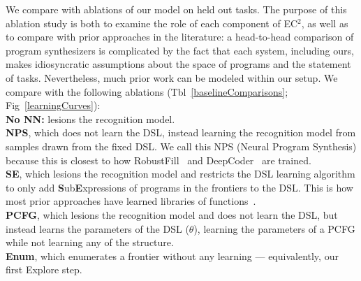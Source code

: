 \documentclass{article}
\newcommand{\systemEnding}{\textsc{EC$^2$}}
\begin{document}
We compare with ablations of our model on held out tasks.
The purpose of this ablation study is 
both to examine the role of each component of \systemEnding,
as well as to compare with
prior approaches in the literature:
a head-to-head
comparison of program synthesizers is complicated by the fact that
each system, including ours, makes idiosyncratic 
assumptions about the space of programs and the statement of tasks.
Nevertheless, much prior work can be modeled within our setup. 
We compare with the following ablations (Tbl~\ref{baselineComparisons};
Fig~\ref{learningCurves}):
\\\noindent \textbf{No NN:} lesions the recognition model.
\\\noindent \textbf{NPS}, which does not learn the DSL,
instead learning the recognition model
from samples drawn from the fixed DSL.
We call this NPS (Neural Program Synthesis)
because this is closest to how
RobustFill~\cite{devlin2017robustfill} and DeepCoder~\cite{balog2016deepcoder} are trained.
\\\noindent \textbf{SE}, which lesions the recognition model and restricts the DSL  learning algorithm to
only add \textbf{S}ub\textbf{E}xpressions of programs in the frontiers to the DSL. This is how most prior approaches have learned libraries of functions~\cite{Dechter:2013:BLV:2540128.2540316,DBLP:conf/icml/LiangJK10,DBLP:conf/ecai/LinDETM14}.
\\\noindent \textbf{PCFG}, which lesions the recognition model and does not learn the DSL,
but instead learns the parameters of the DSL ($\theta$), learning the parameters of a PCFG while not learning any of the structure.
\\\noindent \textbf{Enum}, which enumerates a frontier without any learning --- equivalently, our first Explore step.
\end{document}
